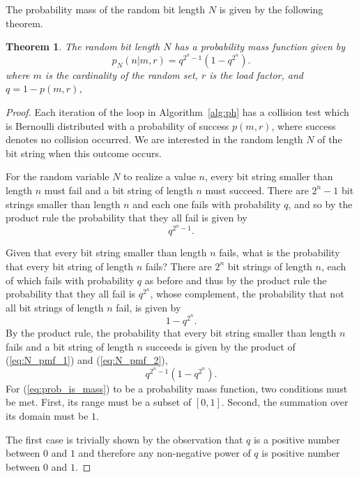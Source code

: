 \documentclass[hidelinks,11pt,final]{article}
\newcommand{\envnumstyle}{section}
\theoremstyle{plain}
\newtheorem{theorem}{Theorem}[\envnumstyle]
\begin{document}
The probability mass of the random bit length $N$ is given by the following theorem.
\begin{theorem}
\label{thm:N_pmf}
The random bit length $N$ has a probability mass function given by
\begin{equation}
\label{eq:N_pmf}
    p_N(n | m, r) = q^{2^n-1}\left(1 - q^{2^n}\right).
\end{equation}
where $m$ is the cardinality of the random set, $r$ is the load factor, and $q = 1 - p(m,r)$, 
\end{theorem}
\begin{proof}
Each iteration of the loop in Algorithm~\ref{alg:ph} has a collision test which is Bernoulli distributed with a probability of success $p(m,r)$, where success denotes no collision occurred. We are interested in the random length $N$ of the bit string when this outcome occurs.

For the random variable $N$ to realize a value $n$, every bit string smaller than length $n$ must fail and a bit string of length $n$ must succeed. There are $2^n-1$ bit strings smaller than length $n$ and each one fails with probability $q$, and so by the product rule the probability that they all fail is given by
\begin{equation}
\label{eq:N_pmf_1}
    q^{2^n - 1}.
\end{equation}

Given that every bit string smaller than length $n$ fails, what is the probability that every bit string of length $n$ fails? There are $2^n$ bit strings of length $n$, each of which fails with probability $q$ as before and thus by the product rule the probability that they all fail is $q^{2^n}$, whose complement, the probability that not all bit strings of length $n$ fail, is given by
\begin{equation}
\label{eq:N_pmf_2}
    1 - q^{2^n}.
\end{equation}
By the product rule, the probability that every bit string smaller than length $n$ fails and a bit string of length $n$ succeeds is given by the product of (\ref{eq:N_pmf_1}) and (\ref{eq:N_pmf_2}),
\begin{equation}
\label{eq:prob_is_mass}
    q^{2^n-1}\left(1 - q^{2^n}\right).
\end{equation}
For (\ref{eq:prob_is_mass}) to be a probability mass function, two conditions must be met. First, its range must be a subset of $[0,1]$. Second, the summation over its domain must be $1$.

The first case is trivially shown by the observation that $q$ is a positive number between $0$ and $1$ and therefore any non-negative power of $q$ is positive number between $0$ and $1$.


\end{proof}
\end{document}
